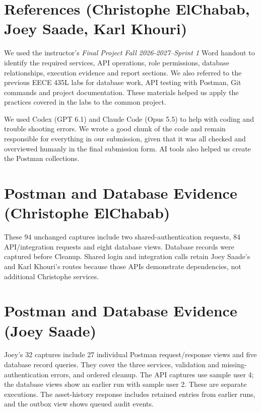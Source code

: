 \documentclass[11pt,a4paper]{article}
\begin{document}
\section{References (Christophe ElChabab, Joey Saade, Karl Khouri)}
\label{sec:references}
We used the instructor's \emph{Final Project Fall 2026-2027--Sprint 1} Word handout to identify the required services, API operations, role permissions, database relationships, execution evidence and report sections. We also referred to the previous EECE 435L labs for database work, API testing with Postman, Git commands and project documentation. These materials helped us apply the practices covered in the labs to the common project.

We used Codex (GPT 6.1) and Claude Code (Opus 5.5) to help with coding and trouble shooting errors. We wrote a good chunk of the code and remain responsible for everything in our submission, given that it was all checked and overviewed humanly in the final submission form. AI tools also helped us create the Postman collections.

\clearpage\appendix
\section{Postman and Database Evidence (Christophe ElChabab)}
\label{app:christophe}
These 94 unchanged captures include two shared-authentication requests, 84 API/integration requests and eight database views. Database records were captured before Cleanup. Shared login and integration calls retain Joey Saade's and Karl Khouri's routes because those APIs demonstrate dependencies, not additional Christophe services.
\begin{landscape}\pagestyle{plain}\end{landscape}

\section{Postman and Database Evidence (Joey Saade)}
\label{app:joey}
Joey's 32 captures include 27 individual Postman request/response views and five database record queries. They cover the three services, validation and missing-authentication errors, and ordered cleanup. The API captures use sample user 4; the database views show an earlier run with sample user 2. These are separate executions. The asset-history response includes retained entries from earlier runs, and the outbox view shows queued audit events.
\begin{landscape}\pagestyle{plain}\end{landscape}
\end{document}
